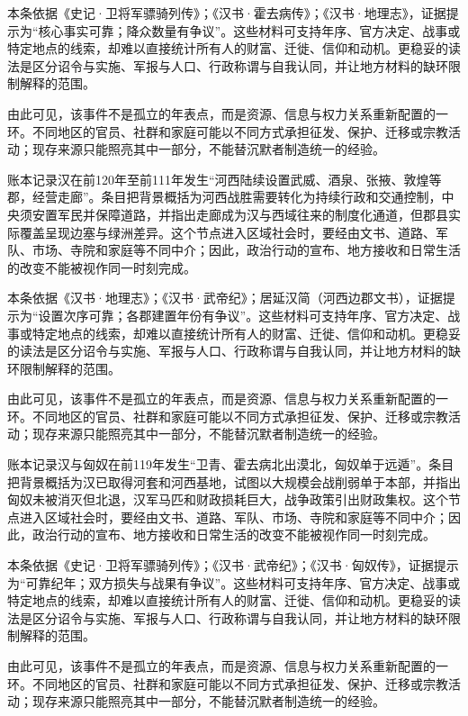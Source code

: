 本条依据《史记·卫将军骠骑列传》；《汉书·霍去病传》；《汉书·地理志》，证据提示为“核心事实可靠；降众数量有争议”。这些材料可支持年序、官方决定、战事或特定地点的线索，却难以直接统计所有人的财富、迁徙、信仰和动机。更稳妥的读法是区分诏令与实施、军报与人口、行政称谓与自我认同，并让地方材料的缺环限制解释的范围。

由此可见，该事件不是孤立的年表点，而是资源、信息与权力关系重新配置的一环。不同地区的官员、社群和家庭可能以不同方式承担征发、保护、迁移或宗教活动；现存来源只能照亮其中一部分，不能替沉默者制造统一的经验。

账本记录汉在前120年至前111年发生“河西陆续设置武威、酒泉、张掖、敦煌等郡，经营走廊”。条目把背景概括为河西战胜需要转化为持续行政和交通控制，中央须安置军民并保障道路，并指出走廊成为汉与西域往来的制度化通道，但郡县实际覆盖呈现边塞与绿洲差异。这个节点进入区域社会时，要经由文书、道路、军队、市场、寺院和家庭等不同中介；因此，政治行动的宣布、地方接收和日常生活的改变不能被视作同一时刻完成。

本条依据《汉书·地理志》；《汉书·武帝纪》；居延汉简（河西边郡文书），证据提示为“设置次序可靠；各郡建置年份有争议”。这些材料可支持年序、官方决定、战事或特定地点的线索，却难以直接统计所有人的财富、迁徙、信仰和动机。更稳妥的读法是区分诏令与实施、军报与人口、行政称谓与自我认同，并让地方材料的缺环限制解释的范围。

由此可见，该事件不是孤立的年表点，而是资源、信息与权力关系重新配置的一环。不同地区的官员、社群和家庭可能以不同方式承担征发、保护、迁移或宗教活动；现存来源只能照亮其中一部分，不能替沉默者制造统一的经验。

账本记录汉与匈奴在前119年发生“卫青、霍去病北出漠北，匈奴单于远遁”。条目把背景概括为汉已取得河套和河西基地，试图以大规模会战削弱单于本部，并指出匈奴未被消灭但北退，汉军马匹和财政损耗巨大，战争政策引出财政集权。这个节点进入区域社会时，要经由文书、道路、军队、市场、寺院和家庭等不同中介；因此，政治行动的宣布、地方接收和日常生活的改变不能被视作同一时刻完成。

本条依据《史记·卫将军骠骑列传》；《汉书·武帝纪》；《汉书·匈奴传》，证据提示为“可靠纪年；双方损失与战果有争议”。这些材料可支持年序、官方决定、战事或特定地点的线索，却难以直接统计所有人的财富、迁徙、信仰和动机。更稳妥的读法是区分诏令与实施、军报与人口、行政称谓与自我认同，并让地方材料的缺环限制解释的范围。

由此可见，该事件不是孤立的年表点，而是资源、信息与权力关系重新配置的一环。不同地区的官员、社群和家庭可能以不同方式承担征发、保护、迁移或宗教活动；现存来源只能照亮其中一部分，不能替沉默者制造统一的经验。

